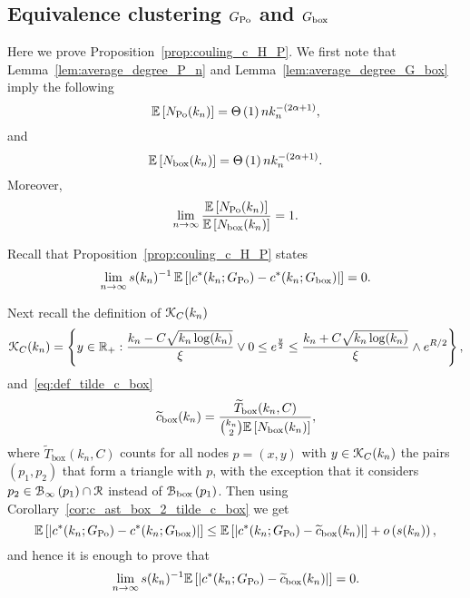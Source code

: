 \subsection{Equivalence clustering $G_{{\mathrm{Po}}}$ and $G_{\mathrm{box}}$}\label{ssec:coupling_HP_ast_P}


Here we prove Proposition~\ref{prop:couling_c_H_P}. We first note that Lemma~\ref{lem:average_degree_P_n} and Lemma~\ref{lem:average_degree_G_box} imply the following
\begin{equation} \label{eq:n_k_Hyp}
	\mathbb{E}\left[N_{{\mathrm{Po}}}(k_n)\right] = \Theta\left(1\right) n k_n^{-(2\alpha + 1)},
\end{equation}
and
\begin{equation} \label{eq:n_k_Po}
	\mathbb{E}\left[N_{\mathrm{box}}(k_n)\right] = \Theta\left(1\right) n k_n^{-(2\alpha + 1)}.
\end{equation}
Moreover,
\begin{equation}\label{eq:equivalence_N_HP_P}
	\lim_{n \to \infty} \frac{\mathbb{E}\left[N_{{\mathrm{Po}}}(k_n)\right]}{\mathbb{E}\left[N_{\mathrm{box}}(k_n)\right]} = 1.
\end{equation}

Recall that Proposition~\ref{prop:couling_c_H_P} states
\[
	\lim_{n \to \infty} s(k_n)^{-1} \, \mathbb{E}\left[\left|c^\ast(k_n; G_{{\mathrm{Po}}}) - c^\ast(k_n;G_{\mathrm{box}})\right|\right] = 0.
\]

Next recall the definition of ${\mathcal K}_{C}(k_n)$
\[
	{\mathcal K}_C(k_n) = \left\{y \in {\ensuremath{\mathbb R}}_+ : \frac{k_n - C \sqrt{k_n \log(k_n)}}{\xi} \vee 0 \le e^{\frac{y}{2}}
	\le \frac{k_n + C \sqrt{k_n \log(k_n)}}{\xi} \wedge e^{R/2} \right\},
\]
and~\eqref{eq:def_tilde_c_box}
\[
	\widetilde{c}_{\text{box}}(k_n) = \frac{\widetilde{T}_{\text{box}}(k_n,C)}{\binom{k_n}{2}\mathbb{E}\left[N_{\text{box}}(k_n)\right]},
\]
where $\widetilde{T}_{\text{box}}(k_n,C)$ counts for all nodes $p = (x,y)$ with $y \in {\mathcal K}_{C}(k_n)$ the pairs $(p_1,p_2)$ that form a triangle with $p$, with the exception that it considers $p_2 \in {\mathcal B}_{\infty}\left(p_1\right) \cap {\mathcal R}$ instead of ${\mathcal B}_{\text{box}}\left(p_1\right)$. Then using Corollary~\ref{cor:c_ast_box_2_tilde_c_box} we get
\[
	\mathbb{E}\left[\left|c^\ast(k_n; G_{{\mathrm{Po}}}) - c^\ast(k_n;G_{\mathrm{box}})\right|\right]
	\le \mathbb{E}\left[\left|c^\ast(k_n; G_{{\mathrm{Po}}}) - \widetilde{c}_{\text{box}}(k_n)\right|\right] 
	+ o\left(s(k_n)\right),
\]
and hence it is enough to prove that
\[
	\lim_{n \to \infty} s(k_n)^{-1}\mathbb{E}\left[\left|c^\ast(k_n; G_{{\mathrm{Po}}}) - \widetilde{c}_{\text{box}}(k_n)\right|\right] = 0.
\]



